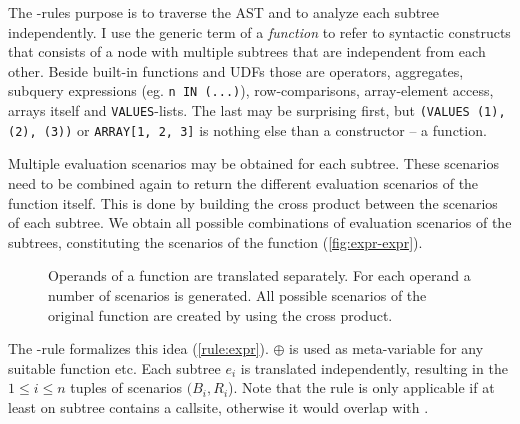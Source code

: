 The \REXPR-rules purpose is to traverse the AST and to analyze each subtree independently. I use the generic term of a \textit{function} to refer to syntactic constructs that consists of a node with multiple subtrees that are independent from each other. Beside built-in functions and UDFs those are operators, aggregates, subquery expressions (eg. \texttt{n IN (...)}), row-comparisons, array-element access, arrays itself and \texttt{VALUES}-lists. The last may be surprising first, but \texttt{(VALUES (1), (2), (3))} or \texttt{ARRAY[1, 2, 3]} is nothing else than a constructor -- a function.

Multiple evaluation scenarios may be obtained for each subtree. These scenarios need to be combined again to return the different evaluation scenarios of the function itself. This is done by building the cross product between the scenarios of each subtree. We obtain all possible combinations of evaluation scenarios of the subtrees, constituting the scenarios of the function (\autoref{fig:expr-expr}).

\begin{figure}[h]
    \centering
    
    \caption{Operands of a function are translated separately. For each operand a number of scenarios is generated. All possible scenarios of the original function are created by using the cross product.}
    \label{fig:expr-expr}
\end{figure}

\iffalse
$
\inferrule*[Right=(expr)]{
    \inferrule*[Left=(rec)]{ }{
        {\begin{minipage}[b]{15em}
        \texttt{(TRUE, fib($1 - 1)) ->}
        \texttt{({}, {(TRUE, fib($1 - 1))})}
        \end{minipage}}
    }\\
    \inferrule*[Right=(rec)]{ }{
        {\begin{minipage}[b]{15em}
        \texttt{(TRUE, fib($1 - 2)) ->}
        \texttt{({}, {(TRUE, fib($1 - 2))})}
        \end{minipage}}
    }
}{
    {\begin{minipage}[b]{25em}
    \texttt{(TRUE, fib($1 - 1) + fib($1 - 2)) ->}
    \texttt{({}, {(TRUE AND TRUE AND TRUE, fib($1 - 1) + fib($1 - 2))})}
    \end{minipage}}
}
$
\fi

The \REXPR-rule formalizes this idea (\autoref{rule:expr}). $\oplus$ is used as meta-variable for any suitable function etc. Each subtree $e_i$ is translated independently, resulting in the $1 \leq i \leq n$ tuples of scenarios $(B_i, R_i$). Note that the rule is only applicable if at least on subtree contains a callsite, otherwise it would overlap with \RBASE.

